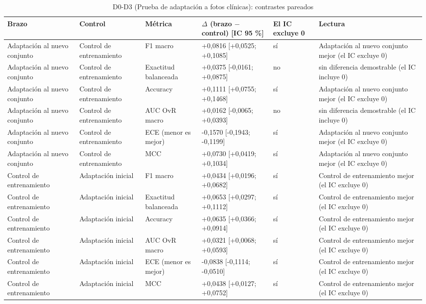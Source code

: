 \begingroup\scriptsize
\begin{longtable}{@{}llllll@{}}
\caption{D0-D3 (Prueba de adaptación a fotos clínicas): contrastes pareados}\label{tab:e2-contrasts} \\
\toprule
Brazo & Control & Métrica & $\Delta$ (brazo $-$ control) [IC 95 \%] & El IC excluye 0 & Lectura \\
\midrule
Adaptación al nuevo conjunto & Control de entrenamiento & F1 macro & +0,0816 [+0,0525; +0,1085] & sí & Adaptación al nuevo conjunto mejor (el IC excluye 0) \\
Adaptación al nuevo conjunto & Control de entrenamiento & Exactitud balanceada & +0,0375 [-0,0161; +0,0875] & no & sin diferencia demostrable (el IC incluye 0) \\
Adaptación al nuevo conjunto & Control de entrenamiento & Accuracy & +0,1111 [+0,0755; +0,1468] & sí & Adaptación al nuevo conjunto mejor (el IC excluye 0) \\
Adaptación al nuevo conjunto & Control de entrenamiento & AUC OvR macro & +0,0162 [-0,0065; +0,0393] & no & sin diferencia demostrable (el IC incluye 0) \\
Adaptación al nuevo conjunto & Control de entrenamiento & ECE (menor es mejor) & -0,1570 [-0,1943; -0,1199] & sí & Adaptación al nuevo conjunto mejor (el IC excluye 0) \\
Adaptación al nuevo conjunto & Control de entrenamiento & MCC & +0,0730 [+0,0419; +0,1034] & sí & Adaptación al nuevo conjunto mejor (el IC excluye 0) \\
Control de entrenamiento & Adaptación inicial & F1 macro & +0,0434 [+0,0196; +0,0682] & sí & Control de entrenamiento mejor (el IC excluye 0) \\
Control de entrenamiento & Adaptación inicial & Exactitud balanceada & +0,0653 [+0,0297; +0,1112] & sí & Control de entrenamiento mejor (el IC excluye 0) \\
Control de entrenamiento & Adaptación inicial & Accuracy & +0,0635 [+0,0366; +0,0914] & sí & Control de entrenamiento mejor (el IC excluye 0) \\
Control de entrenamiento & Adaptación inicial & AUC OvR macro & +0,0321 [+0,0068; +0,0593] & sí & Control de entrenamiento mejor (el IC excluye 0) \\
Control de entrenamiento & Adaptación inicial & ECE (menor es mejor) & -0,0838 [-0,1114; -0,0510] & sí & Control de entrenamiento mejor (el IC excluye 0) \\
Control de entrenamiento & Adaptación inicial & MCC & +0,0438 [+0,0127; +0,0752] & sí & Control de entrenamiento mejor (el IC excluye 0) \\

\end{longtable}
